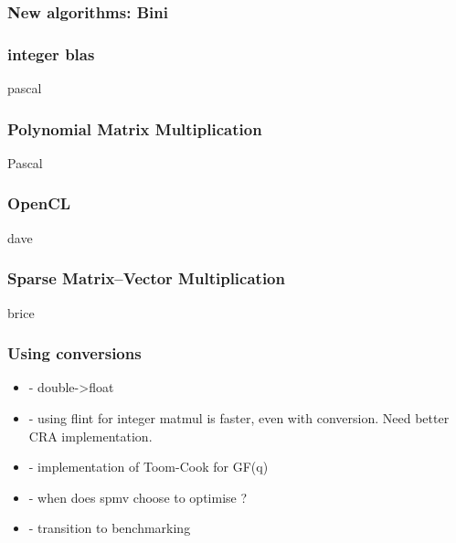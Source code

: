 \subsubsection{New algorithms: Bini}
\cite{BD:2014:Bini}
%
%
%
\subsubsection{integer blas}
%
\danger pascal
%
\subsubsection{Polynomial Matrix Multiplication}
\danger Pascal
\subsubsection{OpenCL}
%
\danger dave
\subsubsection{Sparse Matrix--Vector Multiplication}
\danger brice
\subsubsection{Using conversions}
\begin{itemize}
	\item
- double->float
	\item
- using flint for integer matmul is faster, even with conversion. Need better CRA implementation.
	\item
- implementation of Toom-Cook for GF(q)
	\item
- when does spmv choose to optimise ?
	\item
- transition to benchmarking
\end{itemize}
